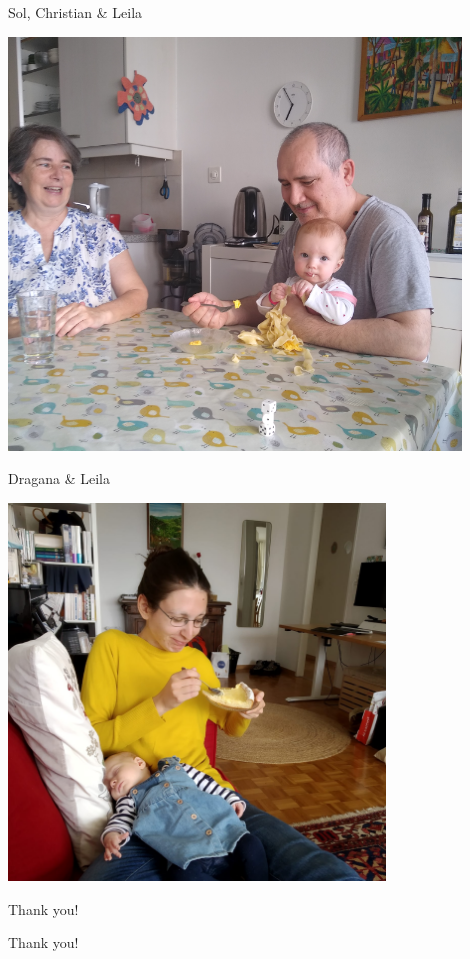 \documentclass[10pt]{beamer}
\newenvironment{slide}[2][]
  {\begin{frame}[fragile,environment=slide,#1]{#2}}
  {\end{frame}}
\begin{document}
\begin{slide}{Sol, Christian \& Leila}
\begin{center}
\includegraphics[width=0.9\textwidth]{figures/parents.jpg}
\end{center}
\end{slide}

\begin{slide}{Dragana \& Leila}
\begin{center}
\includegraphics[width=0.75\textwidth]{figures/dragana.jpg}
\end{center}
\end{slide}

\begin{slide}{Thank you!}
\begin{center}
\Huge Thank you!
\end{center}
\end{slide}
\end{document}
